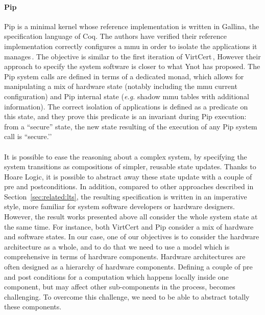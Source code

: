 \paragraph{Pip}
%
Pip is a minimal kernel whose reference implementation is written in {\sc
  Gallina}, the specification language of Coq.
%
The authors have verified their reference implementation correctly configures a
\ac{mmu} in order to isolate the applications it manages\,\cite{jomaa2016mmu}.
%
The objective is similar to the first iteration of
VirtCert\,\cite{barthe2011virtcert1}, However their approach to specify the
system software is closer to what Ynot has proposed.
%
The Pip system calls are defined in terms of a dedicated monad, which allows for
manipulating a mix of hardware state (notably including the \ac{mmu} current
configuration) and Pip internal state (\emph{e.g.} shadow \ac{mmu} tables with
additional information).
%
The correct isolation of applications is defined as a predicate on this state,
and they prove this predicate is an invariant during Pip execution:
%
from a ``secure'' state, the new state resulting of the execution of any Pip
system call is ``secure.’’

\paragraph{}
%
It is possible to ease the reasoning about a complex system, by specifying the
system transitions as compositions of simpler, reusable state updates.
%
Thanks to Hoare Logic, it is possible to abstract away these state update with a
couple of pre and postconditions.
%
In addition, compared to other approaches described in
Section~\ref{sec:related:lts}, the resulting specification is written in an
imperative style, more familiar for system software developers or hardware
designers.
%
However, the result works presented above all consider the whole system state at
the same time.
%
For instance, both VirtCert and Pip consider a mix of hardware and software
states.
%
In our case, one of our objectives is to consider the hardware architecture as a
whole, and to do that we need to use a model which is comprehensive in terms of
hardware components.
%
Hardware architectures are often designed as a hierarchy of hardware components.
%
Defining a couple of pre and post conditions for a computation which happens
locally inside one component, but may affect other sub-components in the
process, becomes challenging.
%
To overcome this challenge, we need to be able to abstract totally these
components.

